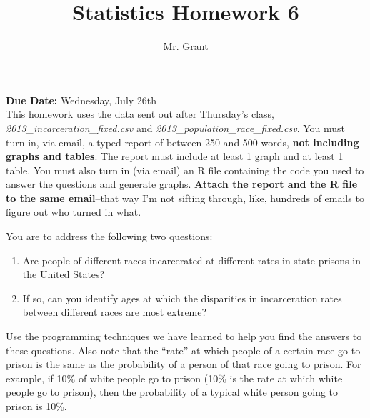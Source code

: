 \documentclass[12pt]{article}
\begin{document}
\title{Statistics Homework 6}
\author{Mr. Grant}
\maketitle

\textbf{Due Date:} Wednesday, July 26th \\

This homework uses the data sent out after Thursday's class, \textit{2013\_incarceration\_fixed.csv} and \textit{2013\_population\_race\_fixed.csv}. You must turn in, via email, a typed report of between 250 and 500 words, \textbf{not including graphs and tables}. The report must include at least 1 graph and at least 1 table. You must also turn in (via email) an R file containing the code you used to answer the questions and generate graphs. \textbf{Attach the report and the R file to the same email}--that way I'm not sifting through, like, hundreds of emails to figure out who turned in what.

You are to address the following two questions:
\begin{enumerate}
	\item Are people of different races incarcerated at different rates in state prisons in the United States?
	\item If so, can you identify ages at which the disparities in incarceration rates between different races are most extreme?
\end{enumerate}
Use the programming techniques we have learned to help you find the answers to these questions. Also note that the ``rate'' at which people of a certain race go to prison is the same as the probability of a person of that race going to prison. For example, if 10\% of white people go to prison (10\% is the rate at which white people go to prison), then the probability of a typical white person going to prison is 10\%.
\end{document}
